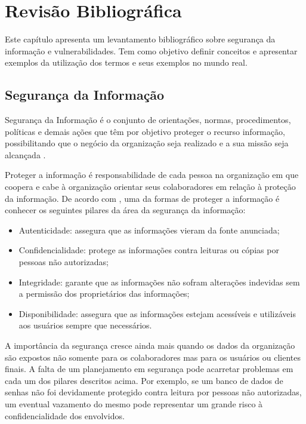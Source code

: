 \chapter[Revisão Bibliográfica]{Revisão Bibliográfica}

Este capítulo apresenta um levantamento bibliográfico sobre segurança da informação e vulnerabilidades. Tem como objetivo definir conceitos e apresentar exemplos da utilização dos termos e seus exemplos no mundo real.

\section{Segurança da Informação}

Segurança da Informação é o conjunto de orientações, normas, procedimentos, políticas e demais ações que têm por objetivo proteger o recurso informação, possibilitando que o negócio da organização seja realizado e a sua missão seja alcançada
\cite{Fontes2017}.

Proteger a informação é responsabilidade de cada pessoa na organização em que coopera e cabe à organização orientar seus colaboradores em relação à proteção da informação. De acordo com , uma da formas de proteger a informação é conhecer os seguintes pilares da área da segurança da informação:

\begin{itemize}
\item Autenticidade: assegura que as informações vieram da fonte anunciada;
\item Confidencialidade: protege as informações contra leituras ou cópias por pessoas não autorizadas;
\item Integridade: garante que as informações não sofram alterações indevidas sem a permissão dos proprietários das informações;
\item Disponibilidade: assegura que as informações estejam acessíveis e utilizáveis aos usuários sempre que necessários.
\end{itemize}

A importância da segurança cresce ainda mais quando os dados da organização são expostos não somente para os colaboradores mas para os usuários ou clientes finais. A falta de um planejamento em segurança pode acarretar problemas em cada um dos pilares descritos acima. Por exemplo, se um banco de dados de senhas não foi devidamente protegido contra leitura por pessoas não autorizadas, um eventual vazamento do mesmo pode representar um grande risco à confidencialidade dos envolvidos. 

